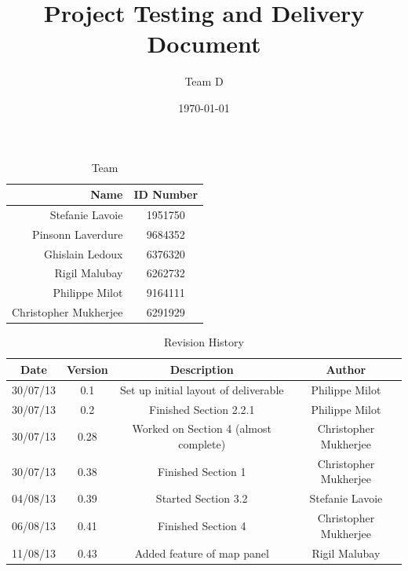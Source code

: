\documentclass{article}
\begin{document}
\title{Project Testing and Delivery Document}
\author{Team D}
\date{\today}

\maketitle

\vspace*{3.5in}
\begin{table}[htbp]
\caption{Team}
\begin{center}
\begin{tabular}{|r | c|}
\hline
Name & ID Number \\
\hline\hline
Stefanie Lavoie & 1951750 \\
Pinsonn Laverdure & 9684352 \\
Ghislain Ledoux & 6376320 \\
Rigil Malubay & 6262732 \\
Philippe Milot & 9164111 \\
Christopher Mukherjee & 6291929 \\
\hline
\end{tabular}
\end{center}
\end{table}

\clearpage

\begin{table}[htbp]
\caption{Revision History}
\begin{center}
\begin{tabular}{|c | c | c | c| }
\hline
Date & Version & Description & Author \\
\hline\hline
30/07/13 & 0.1 & Set up initial layout of deliverable & Philippe Milot \\
\hline
30/07/13 & 0.2 & Finished Section 2.2.1 & Philippe Milot \\
\hline
30/07/13 & 0.28 & Worked on Section 4 (almost complete) & Christopher Mukherjee \\
\hline
30/07/13 & 0.38 & Finished Section 1 & Christopher Mukherjee \\
\hline
04/08/13 & 0.39 & Started Section 3.2 & Stefanie Lavoie \\
\hline
06/08/13 & 0.41 & Finished Section 4 & Christopher Mukherjee \\
\hline
11/08/13 & 0.43 & Added feature of map panel & Rigil Malubay \\
\hline
\end{tabular}
\end{center}
\end{table}
\end{document}
